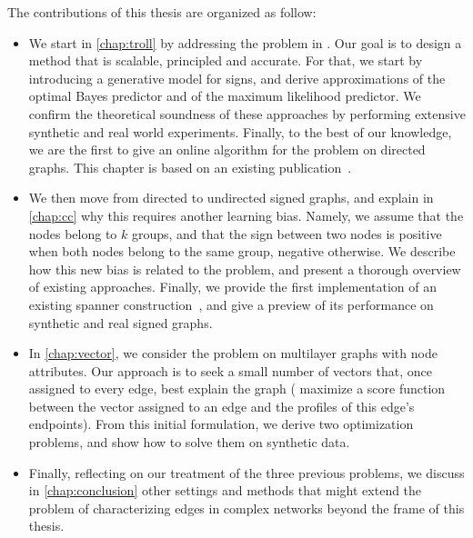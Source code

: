 The contributions of this thesis are organized as follow:

\begin{itemize}

  \item We start in \autoref{chap:troll} by addressing the \esp{} problem in \dssn{}. Our goal is to
    design a method that is scalable, principled and accurate. For that, we start by introducing a
    generative model for signs, and derive approximations of the optimal Bayes predictor and of the
    maximum likelihood predictor. We confirm the theoretical soundness of these approaches by
    performing extensive synthetic and real world experiments. Finally, to the best of our
    knowledge, we are the first to give an online algorithm for the \esp{} problem on directed
    graphs. This chapter is based on an existing publication~\autocite{trollSign17}.

  \item We then move from directed to undirected signed graphs, and explain in \autoref{chap:cc} why
    this requires another learning bias. Namely, we assume that the nodes belong to $k$ groups, and
    that the sign between two nodes is positive when both nodes belong to the same group, negative
    otherwise. We describe how this new bias is related to the \pcc{} problem, and present a
    thorough overview of existing approaches. Finally, we provide the first implementation of an
    existing spanner construction~\autocite{gtxFabio}, and give a preview of its performance on
    synthetic and real signed graphs.

 \item In \autoref{chap:vector}, we consider the \ecp{} problem on multilayer graphs with node
   attributes. Our approach is to seek a small number of vectors that, once assigned to every edge,
   best explain the graph (\ie{} maximize a score function between the vector assigned to an edge
   and the profiles of this edge's endpoints). From this initial formulation, we derive two
   optimization problems, and show how to solve them on synthetic data.

  \item Finally, reflecting on our treatment of the three previous problems, we discuss in
    \autoref{chap:conclusion} other settings and methods that might extend the problem of
    characterizing edges in complex networks beyond the frame of this thesis.

\end{itemize}
